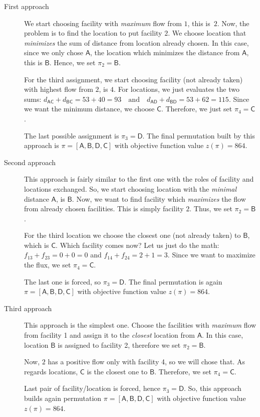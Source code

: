 \begin{description}
	\item[First approach] We start choosing facility with \textit{maximum} flow from $1$, this is~$2$. Now, the problem is to find the location to put facility $2$. We choose location that \textit{minimizes} the sum of distance from location already chosen. In this case, since we only chose $\mathsf{A}$, the location which minimizes the distance from $\mathsf{A}$, this is $\mathsf{B}$. Hence, we set $\pi_2=\mathsf{B}$.
	
	For the third assignment, we start choosing facility (not already taken) with highest flow from $2$, is $4$. For locations, we just evaluates the two sums: 
	$d_{\mathsf{A}\mathsf{C}}+d_{\mathsf{B}\mathsf{C}}=53 + 40 = 93 \quad \text{and} \quad	d_{\mathsf{A}\mathsf{D}}+d_{\mathsf{B}\mathsf{D}}= 53 + 62 = 115$.
	Since we want the minimum distance, we choose $\mathsf{C}$. Therefore, we just set $\pi_4=\mathsf{C}$. 
	
	The last possible assignment is $\pi_3=\mathsf{D}$. The final permutation built by this approach is $\pi=[\mathsf A, \mathsf B, \mathsf D, \mathsf C ]$ with objective function value $z(\pi)=864$.
	
	
	\item[Second approach] 
	This approach is fairly similar to the first one with the roles of facility and locations exchanged. So, we start choosing location with the \textit{minimal} distance $\mathsf{A}$, is $\mathsf{B}$. Now, we want to find facility which \textit{maximizes} the flow from already chosen facilities. This is simply facility $2$. Thus, we set $\pi_2=\mathsf{B}$. 
	
	For the third location we choose the closest one (not already taken) to $\mathsf{B}$, which is $\mathsf{C}$. Which facility comes now? Let us just do the math: $f_{13}+f_{23}=0+0=0$ and $f_{14}+f_{24}=2+1=3$. Since we want to maximize the flux, we set $\pi_4=\mathsf{C}$.
	
	The last one is forced, so $\pi_3=\mathsf{D}$. The final permutation is again $\pi=[\mathsf A, \mathsf B, \mathsf D, \mathsf C ]$ with objective function value $z(\pi)=864$.
	
	
	\item[Third approach] This approach is the simplest one. Choose the facilities with \textit{maximum} flow from facility 1 and assign it to the \textit{closest} location from \textcolor{verdescuro}{$\mathsf A$}. In this case, location \textcolor{verdescuro}{$\mathsf B$} is assigned to facility 2, therefore we set $\pi_2=\mathsf B$. 
	
	Now, $2$ has a positive flow only with facility 4, so we will chose that. As regards locations, $\mathsf C$ is the closest one to $\mathsf B$. Therefore, we set $\pi_4=\mathsf C$. 
	
	Last pair of facility/location is forced, hence $\pi_3=\mathsf D$. So, this approach builds again permutation $\pi=[\mathsf A, \mathsf B, \mathsf D, \mathsf C ]$ with objective function value $z(\pi)=864$.
\end{description}

